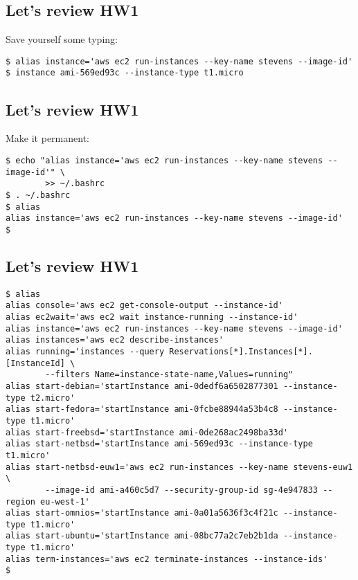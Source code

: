 \documentclass[xga]{xdvislides}
\begin{document}
\subsection{Let's review HW1}
\vspace{.5in}

Save yourself some typing:
\begin{verbatim}
$ alias instance='aws ec2 run-instances --key-name stevens --image-id'
$ instance ami-569ed93c --instance-type t1.micro
\end{verbatim}

\subsection{Let's review HW1}
\vspace{.5in}

Make it permanent:
\begin{verbatim}
$ echo "alias instance='aws ec2 run-instances --key-name stevens --image-id'" \
        >> ~/.bashrc
$ . ~/.bashrc
$ alias
alias instance='aws ec2 run-instances --key-name stevens --image-id'
$ 
\end{verbatim}

\subsection{Let's review HW1}
\begin{verbatim}
$ alias
alias console='aws ec2 get-console-output --instance-id'
alias ec2wait='aws ec2 wait instance-running --instance-id'
alias instance='aws ec2 run-instances --key-name stevens --image-id'
alias instances='aws ec2 describe-instances'
alias running='instances --query Reservations[*].Instances[*].[InstanceId] \
        --filters Name=instance-state-name,Values=running"
alias start-debian='startInstance ami-0dedf6a6502877301 --instance-type t2.micro'
alias start-fedora='startInstance ami-0fcbe88944a53b4c8 --instance-type t1.micro'
alias start-freebsd='startInstance ami-0de268ac2498ba33d'
alias start-netbsd='startInstance ami-569ed93c --instance-type t1.micro'
alias start-netbsd-euw1='aws ec2 run-instances --key-name stevens-euw1 \
        --image-id ami-a460c5d7 --security-group-id sg-4e947833 --region eu-west-1'
alias start-omnios='startInstance ami-0a01a5636f3c4f21c --instance-type t1.micro'
alias start-ubuntu='startInstance ami-08bc77a2c7eb2b1da --instance-type t1.micro'
alias term-instances='aws ec2 terminate-instances --instance-ids'
$ 
\end{verbatim}
\end{document}
